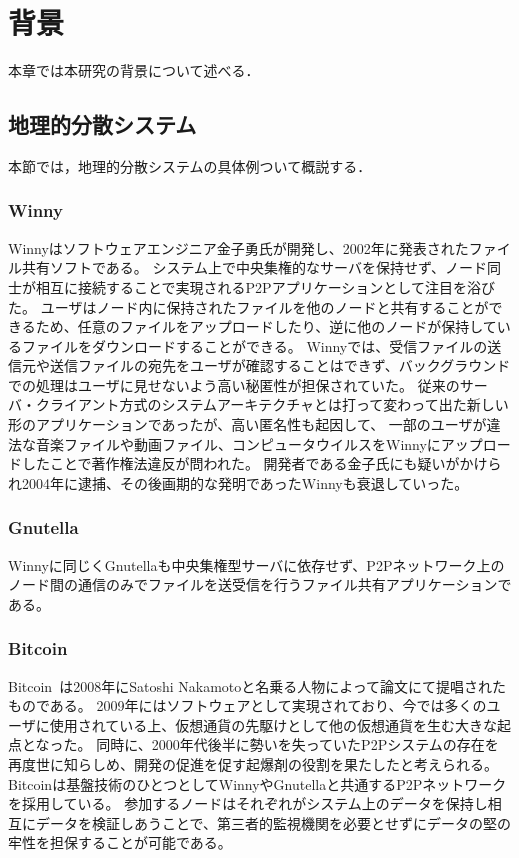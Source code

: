 \chapter{背景}
\label{background}

本章では本研究の背景について述べる．

\section{地理的分散システム}
\label{background:geographically-disdtributed-system}
本節では，地理的分散システムの具体例ついて概説する．

\subsection{Winny}
Winnyはソフトウェアエンジニア金子勇氏が開発し、2002年に発表されたファイル共有ソフトである。
システム上で中央集権的なサーバを保持せず、ノード同士が相互に接続することで実現されるP2Pアプリケーションとして注目を浴びた。
ユーザはノード内に保持されたファイルを他のノードと共有することができるため、任意のファイルをアップロードしたり、逆に他のノードが保持しているファイルをダウンロードすることができる。
Winnyでは、受信ファイルの送信元や送信ファイルの宛先をユーザが確認することはできず、バックグラウンドでの処理はユーザに見せないよう高い秘匿性が担保されていた。
従来のサーバ・クライアント方式のシステムアーキテクチャとは打って変わって出た新しい形のアプリケーションであったが、高い匿名性も起因して、
一部のユーザが違法な音楽ファイルや動画ファイル、コンピュータウイルスをWinnyにアップロードしたことで著作権法違反が問われた。
開発者である金子氏にも疑いがかけられ2004年に逮捕、その後画期的な発明であったWinnyも衰退していった。

\subsection{Gnutella}
Winnyに同じくGnutellaも中央集権型サーバに依存せず、P2Pネットワーク上のノード間の通信のみでファイルを送受信を行うファイル共有アプリケーションである。

\subsection{Bitcoin}
Bitcoin~\cite{Bitcoin}は2008年にSatoshi Nakamotoと名乗る人物によって論文にて提唱されたものである。
2009年にはソフトウェアとして実現されており、今では多くのユーザに使用されている上、仮想通貨の先駆けとして他の仮想通貨を生む大きな起点となった。
同時に、2000年代後半に勢いを失っていたP2Pシステムの存在を再度世に知らしめ、開発の促進を促す起爆剤の役割を果たしたと考えられる。
Bitcoinは基盤技術のひとつとしてWinnyやGnutellaと共通するP2Pネットワークを採用している。
参加するノードはそれぞれがシステム上のデータを保持し相互にデータを検証しあうことで、第三者的監視機関を必要とせずにデータの堅の牢性を担保することが可能である。

